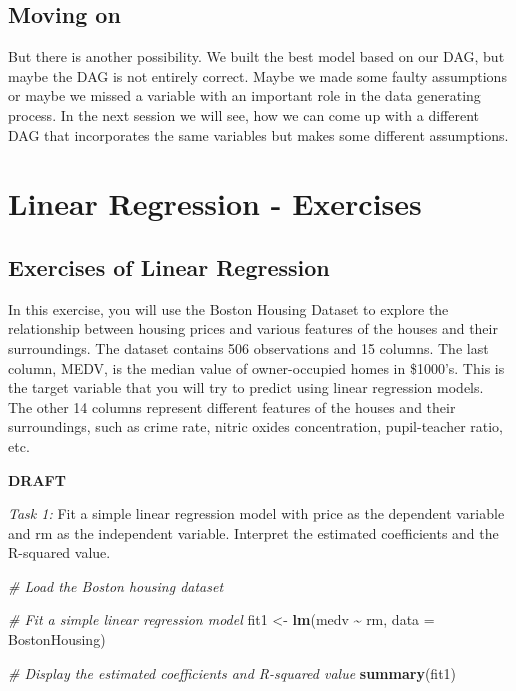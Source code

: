 \documentclass[
]{book}
\newenvironment{Shaded}{\begin{snugshade}}{\end{snugshade}}
\newcommand{\AttributeTok}[1]{\textcolor[rgb]{0.13,0.29,0.53}{#1}}
\newcommand{\CommentTok}[1]{\textcolor[rgb]{0.56,0.35,0.01}{\textit{#1}}}
\newcommand{\FunctionTok}[1]{\textcolor[rgb]{0.13,0.29,0.53}{\textbf{#1}}}
\newcommand{\NormalTok}[1]{#1}
\newcommand{\OtherTok}[1]{\textcolor[rgb]{0.56,0.35,0.01}{#1}}
\newcommand{\SpecialCharTok}[1]{\textcolor[rgb]{0.81,0.36,0.00}{\textbf{#1}}}
\begin{document}
\hypertarget{moving-on-2}{%
\section{Moving on}\label{moving-on-2}}

But there is another possibility. We built the best model based on our DAG, but
maybe the DAG is not entirely correct. Maybe we made some faulty assumptions or
maybe we missed a variable with an important role in the data generating
process. In the next session we will see, how we can come up with a different
DAG that incorporates the same variables but makes some different assumptions.

\hypertarget{lin-e}{%
\chapter{Linear Regression - Exercises}\label{lin-e}}

\hypertarget{exercises-of-linear-regression}{%
\section{Exercises of Linear Regression}\label{exercises-of-linear-regression}}

In this exercise, you will use the Boston Housing Dataset to explore the relationship between housing prices and various features of the houses and their surroundings. The dataset contains 506 observations and 15 columns. The last column, MEDV, is the median value of owner-occupied homes in \$1000's. This is the target variable that you will try to predict using linear regression models. The other 14 columns represent different features of the houses and their surroundings, such as crime rate, nitric oxides concentration, pupil-teacher ratio, etc.

\textbf{DRAFT}

\emph{Task 1:} Fit a simple linear regression model with price as the dependent variable and rm as the independent variable. Interpret the estimated coefficients and the R-squared value.

\begin{Shaded}
\begin{Highlighting}[]
\CommentTok{\# Load the Boston housing dataset}


\CommentTok{\# Fit a simple linear regression model}
\NormalTok{fit1 }\OtherTok{\textless{}{-}} \FunctionTok{lm}\NormalTok{(medv }\SpecialCharTok{\textasciitilde{}}\NormalTok{ rm, }\AttributeTok{data =}\NormalTok{ BostonHousing)}

\CommentTok{\# Display the estimated coefficients and R{-}squared value}
\FunctionTok{summary}\NormalTok{(fit1)}
\end{Highlighting}
\end{Shaded}
\end{document}
